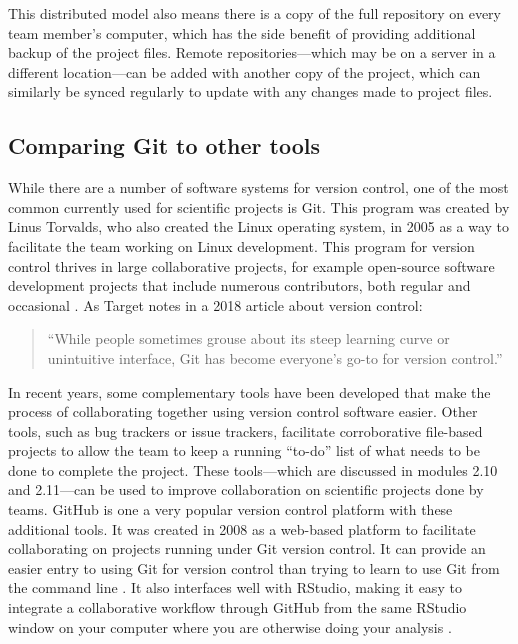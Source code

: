 \documentclass[]{tufte-book}
\begin{document}
This distributed model also means there is a copy of the full repository on
every team member's computer, which has the side benefit of providing additional
backup of the project files. Remote repositories---which may be on a server in a
different location---can be added with another copy of the project, which can
similarly be synced regularly to update with any changes made to project files.

\subsection{Comparing Git to other tools}\label{comparing-git-to-other-tools}

While there are a number of software systems for version control, one of the
most common currently used for scientific projects is Git. This program was
created by Linus Torvalds, who also created the Linux operating system, in 2005
as a way to facilitate the team working on Linux development. This program for
version control thrives in large collaborative projects, for example open-source
software development projects that include numerous contributors, both regular
and occasional \citep{brown2018git}. As Target notes in a 2018 article about
version control:

\begin{quote}
``While people sometimes grouse about its steep learning curve or unintuitive
interface, Git has become everyone's go-to for version control.''
\citep{target2018version}
\end{quote}

In recent years, some complementary tools have been developed that make the
process of collaborating together using version control software easier. Other
tools, such as bug trackers or issue trackers, facilitate corroborative
file-based projects to allow the team to keep a running ``to-do'' list of what
needs to be done to complete the project. These tools---which are discussed in
modules 2.10 and 2.11---can be used to improve collaboration on scientific
projects done by teams. GitHub is one a very popular version control platform
with these additional tools. It was created in 2008 as a web-based platform to
facilitate collaborating on projects running under Git version control. It can
provide an easier entry to using Git for version control than trying to learn to
use Git from the command line \citep{perez2016ten}. It also interfaces well with RStudio,
making it easy to integrate a collaborative workflow through GitHub from the
same RStudio window on your computer where you are otherwise doing your analysis
\citep{perez2016ten}.
\end{document}
